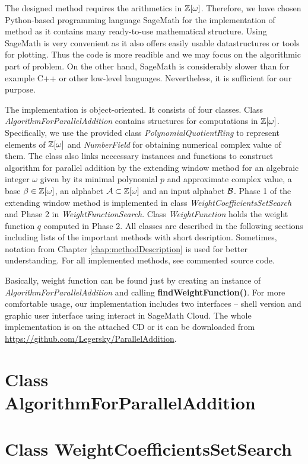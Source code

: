 The designed method requires the arithmetics in $\mathbb{Z}[\omega]$. Therefore, we have chosen Python-based programming language SageMath for the implementation of method as it contains many ready-to-use mathematical structure.  Using SageMath is very convenient as it also offers easily usable datastructures or tools for plotting. Thus the code is more readible and we may focus on the algorithmic part of problem. On the other hand, SageMath is considerably slower than for example C++ or other low-level languages. Nevertheless, it is sufficient for our purpose.

The implementation is object-oriented. It consists of four classes. Class \emph{AlgorithmForParallelAddition} contains structures for computations in $\mathbb{Z}[\omega]$. Specifically, we use the provided class \emph{PolynomialQuotientRing} to represent elements of $\mathbb{Z}[\omega]$ and  \emph{NumberField} for obtaining numerical complex value of them. The class also links neccessary instances and functions to construct algorithm for parallel addition by the extending window method for an algebraic integer $\omega$ given by its minimal polynomial $p$ and approximate complex value, a base $\beta\in\mathbb{Z}[\omega]$, an alphabet $\mathcal{A}\subset\mathbb{Z}[\omega]$ and an input alphabet $\mathcal{B}$. Phase 1 of the extending window method is implemented in class \emph{WeightCoefficientsSetSearch} and Phase 2 in \emph{WeightFunctionSearch}. Class \emph{WeightFunction} holds the weight function $q$ computed in Phase 2. All classes are described in the following sections including lists of the important methods  with short desription. Sometimes, notation from Chapter \ref{chap:methodDescription} is used for better understanding. For all implemented methods, see commented source code.  

Basically, weight function can be found just by creating an instance of \emph{AlgorithmForParallelAddition} and calling \textbf{findWeightFunction()}. For more comfortable usage, our implementation includes two interfaces -- shell version and graphic user interface using interact in SageMath Cloud. The whole implementation is on the attached CD or it can be downloaded from  \url{https://github.com/Legersky/ParallelAddition}.

\section{Class AlgorithmForParallelAddition}



\section{Class WeightCoefficientsSetSearch}



